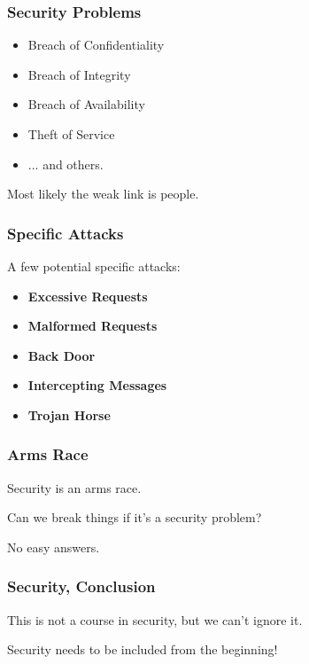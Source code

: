 \begin{frame}
\frametitle{Security Problems}

\begin{itemize}
	\item Breach of Confidentiality
	\item Breach of Integrity
	\item Breach of Availability
	\item Theft of Service
	\item ... and others.
\end{itemize}

Most likely the weak link is people.

\end{frame}


\begin{frame}
\frametitle{Specific Attacks}
A few potential specific attacks:

\begin{itemize}
	\item \textbf{Excessive Requests}
	\item \textbf{Malformed Requests}
	\item \textbf{Back Door}
	\item \textbf{Intercepting Messages}
	\item \textbf{Trojan Horse}
\end{itemize}


\end{frame}


\begin{frame}
\frametitle{Arms Race}

Security is an arms race.

Can we break things if it's a security problem?

No easy answers.


\end{frame}


\begin{frame}
\frametitle{Security, Conclusion}

This is not a course in security, but we can't ignore it.

Security needs to be included from the beginning!


\end{frame}

